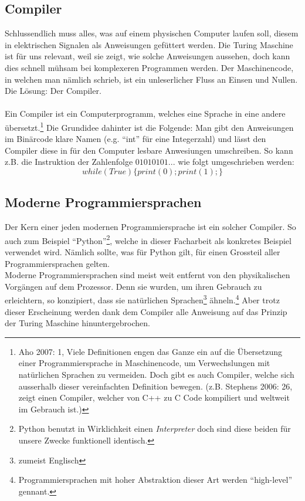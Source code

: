 \documentclass[10pt,a4paper]{article}
\begin{document}
\subsection{Compiler}
Schlussendlich muss alles, was auf einem physischen Computer laufen soll, diesem in elektrischen Signalen als Anweisungen gefüttert werden. Die Turing Maschine ist für uns relevant, weil sie zeigt, wie solche Anweisungen aussehen, doch kann dies schnell mühsam bei komplexeren Programmen werden. Der Maschinencode, in welchen man nämlich schrieb, ist ein unleserlicher Fluss an Einsen und Nullen. Die Lösung: Der Compiler. \\ \\
Ein Compiler ist ein Computerprogramm, welches eine Sprache in eine andere übersetzt.\footnote{Aho 2007: 1, Viele Definitionen engen das Ganze ein auf die Übersetzung einer Programmiersprache in Maschinencode, um Verwechslungen mit natürlichen Sprachen zu vermeiden. Doch gibt es auch Compiler, welche sich ausserhalb dieser vereinfachten Definition bewegen. (z.B. Stephens 2006: 26, zeigt einen Compiler, welcher von C++ zu C Code kompiliert und weltweit im Gebrauch ist.)} Die Grundidee dahinter ist die Folgende: Man gibt den Anweisungen im Binärcode klare Namen (e.g. \enquote{int} für eine Integerzahl) und lässt den Compiler diese in für den Computer lesbare Anwesiungen umschreiben. So kann z.B. die Instruktion der Zahlenfolge $01010101...$ wie folgt umgeschrieben werden: 
$$ while (True) \{ print(0); print(1);\} $$

\subsection{Moderne Programmiersprachen}
Der Kern einer jeden modernen Programmiersprache ist ein solcher Compiler. So auch zum Beispiel \enquote{Python}\footnote{Python benutzt in Wirklichkeit einen \textit{Interpreter} doch sind diese beiden für unsere Zwecke funktionell identisch.}, welche in dieser Facharbeit als konkretes Beispiel verwendet wird. Nämlich sollte, was für Python gilt, für einen Grossteil aller Programmiersprachen gelten.\\
Moderne Programmiersprachen sind meist weit entfernt von den physikalischen Vorgängen auf dem Prozessor. Denn sie wurden, um ihren Gebrauch zu erleichtern, so konzipiert, dass sie natürlichen Sprachen\footnote{zumeist Englisch} ähneln.\footnote{Programmiersprachen mit hoher Abstraktion dieser Art werden \enquote{high-level} gennant.} Aber trotz dieser Erscheinung werden dank dem Compiler alle Anweisung auf das Prinzip der Turing Maschine hinuntergebrochen.
\end{document}
